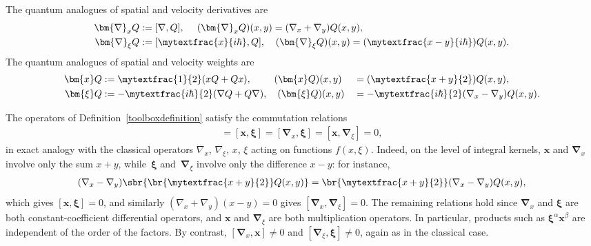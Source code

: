 \begin{definition}\label{toolboxdefinition}
The quantum analogues of spatial and velocity derivatives are
\begin{align*}
\bm{\nabla}_xQ&:=[\nabla,Q],\quad\hspace{0.045cm}\, (\bm{\nabla}_xQ)(x,y)=(\nabla_x+\nabla_y)Q(x,y),\\
\bm{\nabla}_\xi Q&:=[\mytextfrac{x}{i\hbar},Q],\quad \hspace{0.015cm}(\bm{\nabla}_\xi Q)(x,y)=(\mytextfrac{x-y}{i\hbar})Q(x,y).
\end{align*}
The quantum analogues of spatial and velocity weights are
\begin{alignat*}{2}
\bm{x}Q
&:=\mytextfrac{1}{2}(xQ+Qx),\quad\quad\,\,
(\bm{x}Q)(x,y)&&=(\mytextfrac{x+y}{2})Q(x,y),\\
\bm{\xi}Q&:=-\mytextfrac{i\hbar}{2}(\nabla Q+Q\nabla),\quad
(\bm{\xi}Q)(x,y)
&&=-\mytextfrac{i\hbar}{2}(\nabla_x-\nabla_y)Q(x,y).
\end{alignat*}
\end{definition}
\begin{remark}\label{commutationremark}
The operators of Definition~\ref{toolboxdefinition} satisfy the commutation relations
\begin{align*}
[\bm{\nabla}_x,\bm{\nabla}_\xi]=[\bm{x},\bm{\xi}]=[\bm{\nabla}_x,\bm{\xi}]=[\bm{x},\bm{\nabla}_\xi]=0,
\end{align*}
in exact analogy with the classical operators $\nabla_x$, $\nabla_\xi$, $x$, $\xi$ acting on functions $f(x,\xi)$. Indeed, on the level of integral kernels, $\bm{x}$ and $\bm{\nabla}_x$ involve only the sum $x+y$, while~$\bm{\xi}$ and~$\bm{\nabla}_\xi$ involve only the difference $x-y$: for instance,
\begin{align*}
(\nabla_x-\nabla_y)\sbr{\br{\mytextfrac{x+y}{2}}Q(x,y)}=\br{\mytextfrac{x+y}{2}}(\nabla_x-\nabla_y)Q(x,y),
\end{align*}
which gives $[\bm{x},\bm{\xi}]=0$, and similarly $(\nabla_x+\nabla_y)(x-y)=0$ gives $[\bm{\nabla}_x,\bm{\nabla}_\xi]=0$. The remaining relations hold since $\bm{\nabla}_x$ and $\bm{\xi}$ are both constant-coefficient differential operators, and $\bm{x}$ and $\bm{\nabla}_\xi$ are both multiplication operators. In particular, products such as $\bm{\xi}^{\alpha}\bm{x}^{\beta}$ are independent of the order of the factors. By contrast, $[\bm{\nabla}_x,\bm{x}]\neq0$ and $[\bm{\nabla}_\xi,\bm{\xi}]\neq0$, again as in the classical case.
\end{remark}


